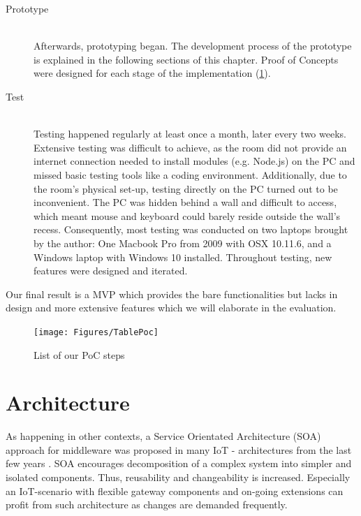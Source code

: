 \begin{description}
	\item [Prototype]\hfill \\
		 Afterwards, prototyping began. 
		 The development process of the prototype is explained in the following sections of this chapter.
	    Proof of Concepts were designed for each stage of the implementation (\ref{fig:PoC}).
	\item [Test]\hfill \\
		  Testing happened regularly at least once a month, later every two weeks.
		Extensive testing was difficult to achieve, as the room did not provide 
		   an internet connection needed to install modules (e.g. Node.js) on the PC 
		   and missed basic testing tools like a coding environment. 
		   Additionally, due to the room's physical set-up, testing directly on the PC turned out 
		   to be inconvenient. The PC was hidden behind a wall and difficult to access, 
		   which meant mouse and keyboard could barely reside outside the wall's recess.
		   Consequently, most testing was conducted on two laptops brought by the author: 
		   One Macbook Pro from 2009 with OSX 10.11.6, and a Windows laptop with Windows 10 installed.
		   Throughout testing, new features were designed and iterated.
\end{description}

Our final result is a MVP %
which provides the bare functionalities but lacks in design 
and more extensive features which we will elaborate in the evaluation.

\begin{figure}[th]
	\centering
	\texttt{[image: Figures/TablePoc]}
	\decoRule
	\caption[Proof of Concept Steps]{List of our PoC steps}
	\label{fig:PoC}
\end{figure}


\section{Architecture}

As happening in other contexts, 
a Service Orientated Architecture (SOA) approach for middleware 
was proposed in many IoT - architectures from the last few years \parencite{archsurv1}. 
SOA encourages decomposition of a complex system into simpler and isolated components.
Thus, reusability and changeability is increased. 
Especially an IoT-scenario with flexible gateway components and on-going extensions can profit from such 
architecture as changes are demanded frequently.
\parencite{archsurv1}

